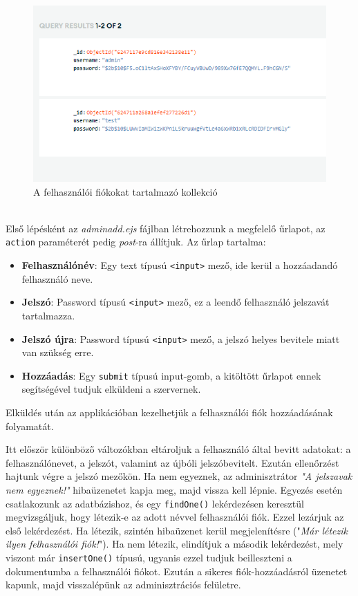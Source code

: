\begin{figure}[h]
	\centering
		\includegraphics[width=12truecm, height=7truecm]{images/kollekcio.png}
	\caption{A felhasználói fiókokat tartalmazó kollekció}
	\label{fig:kollekcio}
\end{figure}

\\

Első lépésként az \textit{adminadd.ejs} fájlban létrehozzunk a megfelelő űrlapot, az \texttt{action} paraméterét pedig \textit{post}-ra állítjuk. Az űrlap tartalma:

\begin{itemize}
\item{\textbf{Felhasználónév}: Egy text típusú \texttt{<input>} mező, ide kerül a hozzáadandó felhasználó neve.}
\item{\textbf{Jelszó}: Password típusú \texttt{<input>} mező, ez a leendő felhasználó jelszavát tartalmazza.}
\item{\textbf{Jelszó újra}: Password típusú \texttt{<input>} mező, a jelszó helyes bevitele miatt van szükség erre.}
\item{\textbf{Hozzáadás}: Egy \texttt{submit} típusú input-gomb, a kitöltött űrlapot ennek segítségével tudjuk elküldeni a szervernek.}
\end{itemize}

Elküldés után az applikációban kezelhetjük a felhasználói fiók hozzáadásának folyamatát.

Itt először különböző változókban eltároljuk a felhasználó által bevitt adatokat: a felhasználónevet, a jelszót, valamint az újbóli jelszóbevitelt. Ezután ellenőrzést hajtunk végre a jelszó mezőkön. Ha nem egyeznek, az adminisztrátor \textit{"A jelszavak nem egyeznek!"} hibaüzenetet kapja meg, majd vissza kell lépnie. Egyezés esetén csatlakozunk az adatbázishoz, és egy \texttt{findOne()} lekérdezésen keresztül megvizsgáljuk, hogy létezik-e az adott névvel felhasználói fiók. Ezzel lezárjuk az első lekérdezést. Ha létezik, szintén hibaüzenet kerül megjelenítésre ("\textit{Már létezik ilyen felhasználói fiók!}"). Ha nem létezik, elindítjuk a második lekérdezést, mely viszont már \texttt{insertOne()} típusú, ugyanis ezzel tudjuk beilleszteni a dokumentumba a felhasználói fiókot. Ezután a sikeres fiók-hozzáadásról üzenetet kapunk, majd visszalépünk az adminisztrációs felületre.\\


